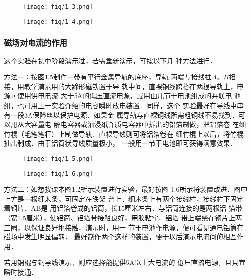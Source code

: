 \begin{figure}[htp]\centering
    \begin{minipage}[t]{0.48\textwidth}
    \centering
\texttt{[image: fig/1-3.png]}
    \caption{}
    \end{minipage}
    \begin{minipage}[t]{0.48\textwidth}
    \centering
\texttt{[image: fig/1-4.png]}
    \caption{}
    \end{minipage}
    \end{figure}

\subsubsection{磁场对电流的作用}
这个实验在初中阶段演示过，若需重新演示，可按以下几
种方法进行．


方法一：按图1.5制作一带有平行金属导轨的底座，导轨
两端与接线柱$A$、$B$相接，用教学演示用的大蹄形磁铁置于导
轨中间，直裸铜线跨搭在两根导轨上，电源可使用供电电流
大于5A的低压直流电源，或用由几节干电池组成的并联电
池组，也可用上一实验介绍的电容瞬时放电装置．同样，这个
实验最好在导线中串有一段3A保险丝以保护电源．如果金
属导轨与直裸铜线所需粗铜线不易找到．可以用从大容量电
解电容器或油浸纸介质电容器中拆出的铝箔制做，把铝箔卷
在细竹棍（毛笔笔杆）上制做导轨．直裸导线则可将铝箔卷在
细竹棍上以后，将竹棍抽出制成．由于铝筒状导线质量极小，
一般用一节干电池即可获得满意效果．

\begin{figure}[htp]\centering
    \begin{minipage}[t]{0.48\textwidth}
    \centering
\texttt{[image: fig/1-5.png]}
    \caption{}
    \end{minipage}
    \begin{minipage}[t]{0.48\textwidth}
    \centering
\texttt{[image: fig/1-6.png]}
    \caption{}
    \end{minipage}
    \end{figure}

方法二：如想按课本图1.2所示装置进行实验，最好按图
1.6所示将装置改进．图中上方是一根细木条，可固定在铁架
台上．细木条上有两个接线柱，接线柱下固定着铜片．AB是
用铝箔卷成的铝筒，长15厘米左右．与铝筒连接的是两根铝
箔带（宽1.5厘米），使铝筒、铝箔带接触良好，用胶粘牢．铝箔
带上端绕在铜片上两三圈，以保证良好地接触．演示时，用一
节干电池作电源，便可看见通电铝筒在磁场中发生明显偏转．
最好制作两个这样的装置，便于以后演示电流间的相互作用．

若用铜棍与铜导线演示，则应选择能提供5A以上大电流的
低压直流电源，且只宜瞬时接通．

